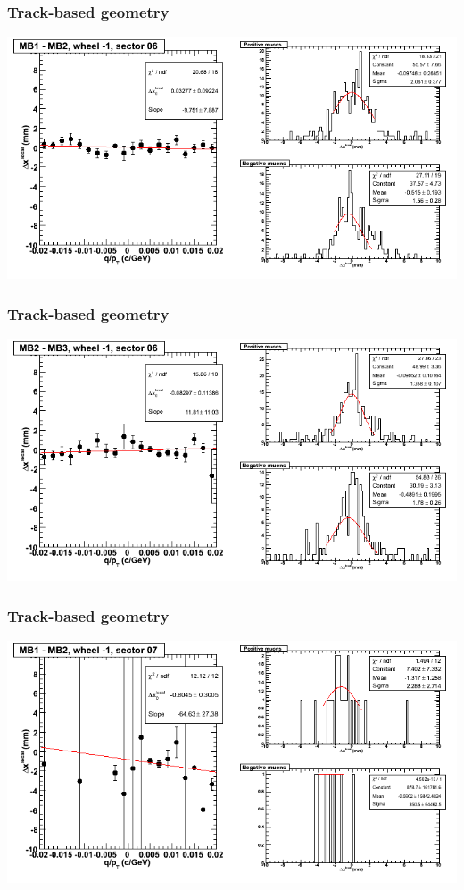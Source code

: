 \documentclass[compress]{beamer}
\begin{document}
\begin{frame}
\frametitle{Track-based geometry}
\includegraphics[width=\linewidth]{NOV4_segdiffs/dt13_resid_B_06_12.png}
\end{frame}

\begin{frame}
\frametitle{Track-based geometry}
\includegraphics[width=\linewidth]{NOV4_segdiffs/dt13_resid_B_06_23.png}
\end{frame}

\begin{frame}
\frametitle{Track-based geometry}
\includegraphics[width=\linewidth]{NOV4_segdiffs/dt13_resid_B_07_12.png}
\end{frame}
\end{document}
